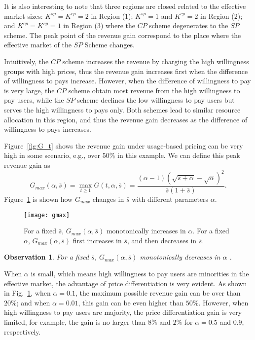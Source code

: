 \documentclass[twocolumn,10pt,twosided]{IEEEtran}
\newtheorem{observation}{Observation}
\begin{document}
It is also interesting to note that three regions  are closed related to the effective market sizes: $K^{sp}=K^{cp}=2$ in  Region (1);  $K^{sp}=1$ and $K^{cp}=2$ in Region (2); and  $K^{cp}=K^{sp}=1$ in Region (3) where the $CP$ scheme degenerates to the $SP$ scheme.  The peak point of the revenue gain correspond to the place where the effective market of the $SP$ Scheme changes.

Intuitively, the $CP$ scheme increases the revenue by charging the high willingness groups with high prices, thus the revenue gain increases first when the difference of willingness to pays increase. However, when the difference of willingness to pay is very large, the $CP$ scheme obtain most revenue from the high willingness to pay users, while the $SP$ scheme declines the low willingness to pay users but serves the high willingness to pays only. Both schemes lead to similar resource allocation in this region, and thus the revenue gain decreases as the difference of willingness to pays increases.



Figure~\ref{fig:G_t} shows the revenue gain under usage-based
pricing can be very high in some scenario, e.g., over $50\%$ in this
example. We can define this peak revenue gain as
\begin{equation*}
G_{max}(\alpha,\bar{s})\!=\!\max_{t\ge 1}
G(t,\alpha,\bar{s})\!=\!\frac{\!(\alpha\!-\!1)(\!\sqrt{\bar{s}\!+\!\alpha}\!-\!\sqrt{\alpha})^2}{\bar{s}(1+\bar{s})\!}.
\end{equation*}
Figure~\ref{fig:gmax} is shown how $G_{max}$ changes in $\bar{s}$ with
different parameters $\alpha$.
\begin{figure}[htb]
\centering
\texttt{[image: gmax]}
\caption{For a fixed $\bar{s}$, $G_{max}(\alpha,\bar{s})$ monotonically increases in $\alpha$. For a fixed $\alpha$, $G_{max}(\alpha,\bar{s})$ first increases in $\bar{s}$, and then decreases in $\bar{s}$.} \label{fig:gmax}
\end{figure}
\begin{observation}
For a fixed $\bar{s}$, $G_{max}(\alpha,\bar{s})$ monotonically decreases in $\alpha$ .
\end{observation}

When $\alpha$ is small, which means high willingness to pay users are minorities in the effective market, the advantage of price differentiation is very evident. As shown in Fig.~\ref{fig:gmax}, when $\alpha= 0.1$, the maximum possible revenue gain can be over than $20\%$; and when $\alpha=0.01$, this gain can be even higher than $50\%$. However, when high willingness to pay users are majority, the price differentiation gain is very limited, for example,  the gain is no larger than $8\%$ and $2\%$  for $\alpha=0.5$ and 0.9, respectively.
\end{document}
